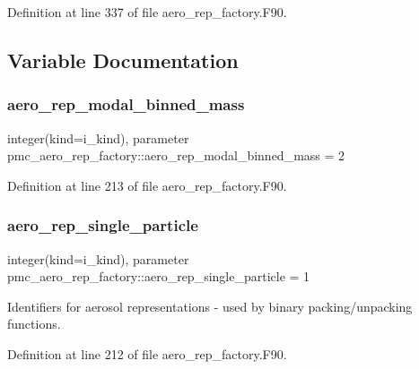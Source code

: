 Definition at line 337 of file aero\+\_\+rep\+\_\+factory.\+F90.



\subsection{Variable Documentation}
\mbox{\label{namespacepmc__aero__rep__factory_a26fa93012c30cd32b47383811765e08b}} 
\subsubsection{\texorpdfstring{aero\+\_\+rep\+\_\+modal\+\_\+binned\+\_\+mass}{aero\_rep\_modal\_binned\_mass}}
{\footnotesize\ttfamily integer(kind=i\+\_\+kind), parameter pmc\+\_\+aero\+\_\+rep\+\_\+factory\+::aero\+\_\+rep\+\_\+modal\+\_\+binned\+\_\+mass = 2\hspace{0.3cm}{\ttfamily [private]}}



Definition at line 213 of file aero\+\_\+rep\+\_\+factory.\+F90.

\mbox{\label{namespacepmc__aero__rep__factory_aa1580bb537129ddd255b271666133c84}} 
\subsubsection{\texorpdfstring{aero\+\_\+rep\+\_\+single\+\_\+particle}{aero\_rep\_single\_particle}}
{\footnotesize\ttfamily integer(kind=i\+\_\+kind), parameter pmc\+\_\+aero\+\_\+rep\+\_\+factory\+::aero\+\_\+rep\+\_\+single\+\_\+particle = 1\hspace{0.3cm}{\ttfamily [private]}}



Identifiers for aerosol representations -\/ used by binary packing/unpacking functions. 



Definition at line 212 of file aero\+\_\+rep\+\_\+factory.\+F90.

